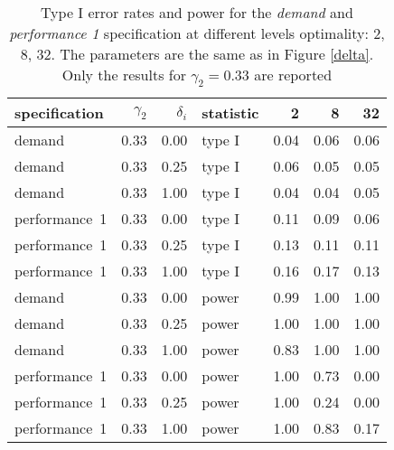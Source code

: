 \begin{table}[ht]
\centering
\begingroup\footnotesize
\begin{tabular}{lrrlrrr}
  \hline
specification & $\gamma_2$ & $\delta_i$ & statistic & 2 & 8 & 32 \\ 
  \hline
demand & 0.33 & 0.00 & type I & 0.04 & 0.06 & 0.06 \\ 
  demand & 0.33 & 0.25 & type I & 0.06 & 0.05 & 0.05 \\ 
  demand & 0.33 & 1.00 & type I & 0.04 & 0.04 & 0.05 \\ 
  performance~1 & 0.33 & 0.00 & type I & 0.11 & 0.09 & 0.06 \\ 
  performance~1 & 0.33 & 0.25 & type I & 0.13 & 0.11 & 0.11 \\ 
  performance~1 & 0.33 & 1.00 & type I & 0.16 & 0.17 & 0.13 \\ 
  demand & 0.33 & 0.00 & power & 0.99 & 1.00 & 1.00 \\ 
  demand & 0.33 & 0.25 & power & 1.00 & 1.00 & 1.00 \\ 
  demand & 0.33 & 1.00 & power & 0.83 & 1.00 & 1.00 \\ 
  performance~1 & 0.33 & 0.00 & power & 1.00 & 0.73 & 0.00 \\ 
  performance~1 & 0.33 & 0.25 & power & 1.00 & 0.24 & 0.00 \\ 
  performance~1 & 0.33 & 1.00 & power & 1.00 & 0.83 & 0.17 \\ 
   \hline
\end{tabular}
\endgroup
\caption{Type I error rates and power for the \emph{demand} and
             \emph{performance 1} specification at different levels optimality: 
             2, 8, 32. The parameters are the same as in Figure \ref{delta}.
             Only the results for $\gamma_{2} = 0.33$ are reported} 
\label{delta-table}
\end{table}
